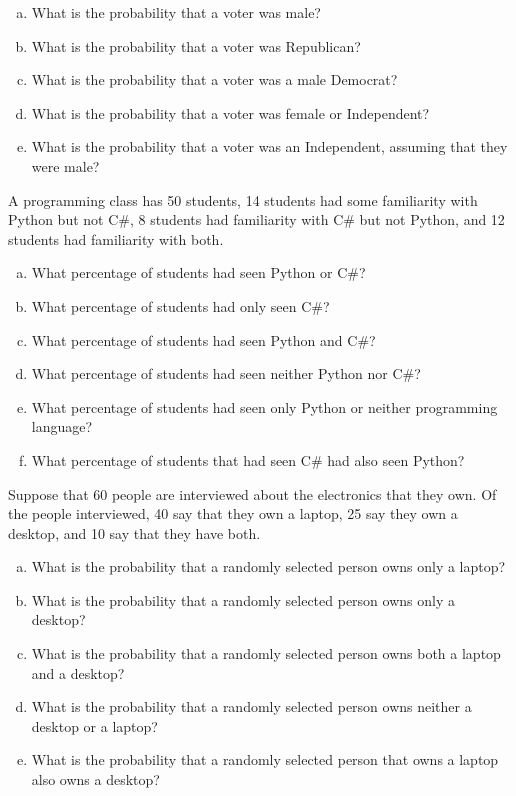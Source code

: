 \documentclass[11pt,letterpaper]{article}
\begin{document}
\begin{enumerate}[(a)]
\item What is the probability that a voter was male?
\item What is the probability that a voter was Republican?
\item What is the probability that a voter was a male Democrat?
\item What is the probability that a voter was female or Independent?
\item What is the probability that a voter was an Independent, assuming that they were male?
\end{enumerate} \pspace

\problem A programming class has 50 students, 14 students had some familiarity with Python but not C\#, 8 students had familiarity with C\# but not Python, and 12 students had familiarity with both.
	\begin{enumerate}[(a)]
	\item What percentage of students had seen Python or C\#?
	\item What percentage of students had only seen C\#?
	\item What percentage of students had seen Python and C\#?
	\item What percentage of students had seen neither Python nor C\#?
	\item What percentage of students had seen only Python or neither programming language?
	\item What percentage of students that had seen C\# had also seen Python?
	\end{enumerate} \pspace

\problem Suppose that 60 people are interviewed about the electronics that they own. Of the people interviewed, 40 say that they own a laptop, 25 say they own a desktop, and 10 say that they have both.
	\begin{enumerate}[(a)]
	\item What is the probability that a randomly selected person owns only a laptop?
	\item What is the probability that a randomly selected person owns only a desktop?
	\item What is the probability that a randomly selected person owns both a laptop and a desktop?
	\item What is the probability that a randomly selected person owns neither a desktop or a laptop?
	\item What is the probability that a randomly selected person that owns a laptop also owns a desktop?
	\end{enumerate}
\end{document}
